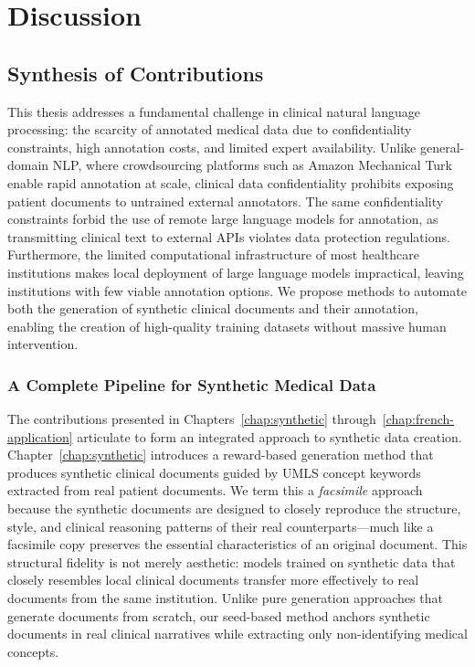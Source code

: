 \chapter{Discussion}
\label{chap:discussion}


\section{Synthesis of Contributions}

This thesis addresses a fundamental challenge in clinical natural language processing: the scarcity of annotated medical data due to confidentiality constraints, high annotation costs, and limited expert availability.
Unlike general-domain NLP, where crowdsourcing platforms such as Amazon Mechanical Turk enable rapid annotation at scale, clinical data confidentiality prohibits exposing patient documents to untrained external annotators.
The same confidentiality constraints forbid the use of remote large language models for annotation, as transmitting clinical text to external APIs violates data protection regulations.
Furthermore, the limited computational infrastructure of most healthcare institutions makes local deployment of large language models impractical, leaving institutions with few viable annotation options.
We propose methods to automate both the generation of synthetic clinical documents and their annotation, enabling the creation of high-quality training datasets without massive human intervention.

\subsection{A Complete Pipeline for Synthetic Medical Data}

The contributions presented in Chapters~\ref{chap:synthetic} through~\ref{chap:french-application} articulate to form an integrated approach to synthetic data creation.
Chapter~\ref{chap:synthetic} introduces a reward-based generation method that produces synthetic clinical documents guided by UMLS concept keywords extracted from real patient documents.
We term this a \emph{facsimile} approach because the synthetic documents are designed to closely reproduce the structure, style, and clinical reasoning patterns of their real counterparts—much like a facsimile copy preserves the essential characteristics of an original document.
This structural fidelity is not merely aesthetic: models trained on synthetic data that closely resembles local clinical documents transfer more effectively to real documents from the same institution.
Unlike pure generation approaches that generate documents from scratch, our seed-based method anchors synthetic documents in real clinical narratives while extracting only non-identifying medical concepts.

